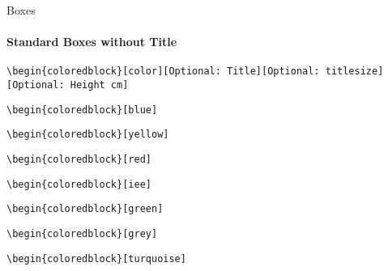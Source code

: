 \documentclass[aspectratio=169]{beamer}
\begin{document}
\begin{frame}{Boxes}
    \framesubtitle{Standard Boxes without Title}

    \footnotesize\centering\texttt{\textbackslash begin\{coloredblock\}[color][Optional:~Title][Optional:~titlesize][Optional:~Height cm]}
    
    \begin{minipage}[t]{0.49\textwidth}

        \begin{coloredblock}[blue]
            \texttt{\textbackslash begin\{coloredblock\}[blue]}\strut
        \end{coloredblock}

        \begin{coloredblock}[yellow]
            \texttt{\textbackslash begin\{coloredblock\}[yellow]}\strut
        \end{coloredblock}

        \begin{coloredblock}[red]
            \texttt{\textbackslash begin\{coloredblock\}[red]}\strut
        \end{coloredblock}

    \end{minipage}
    \hfill
    \begin{minipage}[t]{0.49\textwidth}
        
        \begin{coloredblock}[iee]
            \texttt{\textbackslash begin\{coloredblock\}[iee]}\strut
        \end{coloredblock}

        \begin{coloredblock}[green]
            \texttt{\textbackslash begin\{coloredblock\}[green]}\strut
        \end{coloredblock}

        \begin{coloredblock}[grey]
            \texttt{\textbackslash begin\{coloredblock\}[grey]}\strut
        \end{coloredblock}
        
    \end{minipage}

    \centering
    \begin{minipage}[t]{0.49\textwidth}
        \begin{coloredblock}[turquoise]
                \texttt{\textbackslash begin\{coloredblock\}[turquoise]}\strut
        \end{coloredblock}
    \end{minipage}
\end{frame}
\end{document}
